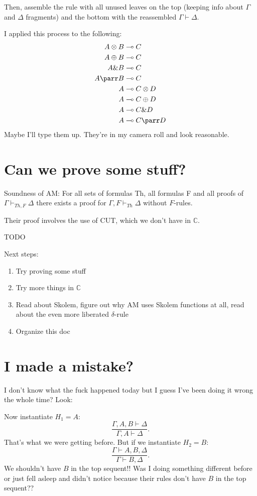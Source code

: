 \documentclass[12pt]{article}
\begin{document}
Then, assemble the rule with all unused leaves on the top (keeping info about
$\Gamma$ and $\Delta$ fragments) and the bottom with the reassembled
$\Gamma\vdash\Delta$.

I applied this process to the following:
\begin{align*}
    A\otimes B &\multimap C \\
    A\oplus B &\multimap C \\
    A\& B &\multimap C \\
    A\parr B &\multimap C \\
    A &\multimap C\otimes D \\
    A &\multimap C\oplus D \\
    A &\multimap C\& D \\
    A &\multimap C\parr D
\end{align*}
Maybe I'll type them up. They're in my camera roll and look reasonable.

\section{Can we prove some stuff?}

Soundness of AM: For all sets of formulas Th, all formulas F and all proofs of
$\Gamma\vdash_{Th,F}\Delta$ there exists a proof for $\Gamma,F\vdash_{Th}\Delta$
without $F$-rules.

Their proof involves the use of CUT, which we don't have in $\mathbb{C}$.

TODO

Next steps:
\begin{enumerate}
    \item Try proving some stuff
    \item Try more things in $\mathbb{C}$
    \item Read about Skolem, figure out why AM uses Skolem functions at all,
        read about the even more liberated $\delta$-rule
    \item Organize this doc
\end{enumerate}

\section{I made a mistake?}

I don't know what the fuck happened today but I guess I've been doing it wrong
the whole time? Look:
\begin{prooftree}
\end{prooftree}
Now instantiate $H_1=A$:
\[
\frac{\Gamma,A,B\vdash\Delta}{\Gamma,A\vdash\Delta}.
\]
That's what we were getting before. But if we instantiate $H_2=B$:
\[
\frac{\Gamma\vdash A,B,\Delta}{\Gamma\vdash B,\Delta}.
\]
We shouldn't have $B$ in the top sequent!! Was I doing something different
before or just fell asleep and didn't notice because their rules don't have $B$
in the top sequent??
\end{document}
